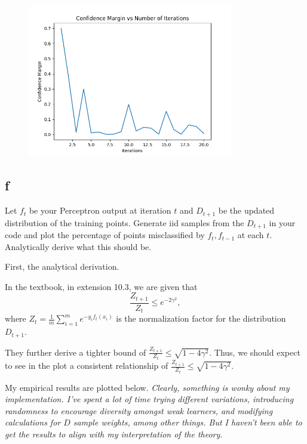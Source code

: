 \documentclass{article}
\begin{document}
\begin{figure}
    \centering
    \includegraphics[width=0.8\textwidth]{images/adaboost_margin.png}
    \label{fig:boosting_margin}
\end{figure}
\clearpage

\subsection{f}

Let $f_t$ be your Perceptron output at iteration $t$ and $D_{t+1}$ be the updated distribution of the training points.
Generate iid samples from the $D_{t+1}$ in your code and plot the percentage of points misclassified by $f_t, f_{t - 1}$ at each $t$.
Analytically derive what this should be.

First, the analytical derivation.

In the textbook, in extension 10.3, we are given that
$$\frac{Z_{t+1}}{Z_t} \leq e^{-2\gamma^2},$$
where $Z_t = \frac{1}{m}\sum\limits_{i=1}^{m} e^{-y_i f_t(x_i)}$ is the normalization factor for the distribution $D_{t+1}$.

They further derive a tighter bound of $\frac{Z_{t+1}}{Z_t} \leq \sqrt{1 - 4\gamma^2}$.
Thus, we should expect to see in the plot a consistent relationship of $\frac{Z_{t+1}}{Z_t} \leq \sqrt{1 - 4\gamma^2}$.

My empirical results are plotted below.
\textit{Clearly, something is wonky about my implementation.
I've spent a lot of time trying different variations, introducing randomness to encourage diversity amongst weak learners, and modifying calculations for $D$ sample weights, among other things.
But I haven't been able to get the results to align with my interpretation of the theory.}
\end{document}
